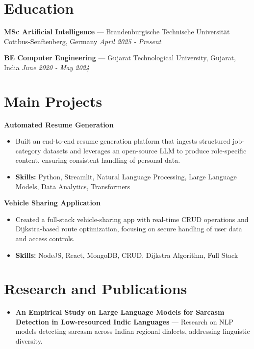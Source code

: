 \documentclass[a4paper,10pt]{article}
\begin{document}
\section*{Education}
\textbf{MSc Artificial Intelligence} — Brandenburgische Technische Universität Cottbus-Senftenberg, Germany \hfill \textit{April 2025 - Present}\par
\vspace{1.5pt}
\textbf{BE Computer Engineering} — Gujarat Technological University, Gujarat, India \hfill \textit{June 2020 - May 2024}\par

\section*{Main Projects}
\textbf{Automated Resume Generation}\par
\vspace{1pt}
\begin{itemize}
  \item Built an end-to-end resume generation platform that ingests structured job-category datasets and leverages an open-source LLM to produce role-specific content, ensuring consistent handling of personal data.
  \item \textbf{Skills:} Python, Streamlit, Natural Language Processing, Large Language Models, Data Analytics, Transformers
\end{itemize}
\vspace{3pt}
\textbf{Vehicle Sharing Application}\par
\vspace{1pt}
\begin{itemize}
  \item Created a full-stack vehicle-sharing app with real-time CRUD operations and Dijkstra-based route optimization, focusing on secure handling of user data and access controls.
  \item \textbf{Skills:} NodeJS, React, MongoDB, CRUD, Dijkstra Algorithm, Full Stack
\end{itemize}

\section*{Research and Publications}
\begin{itemize}
\item \textbf{An Empirical Study on Large Language Models for Sarcasm Detection in Low-resourced Indic Languages} — Research on NLP models detecting sarcasm across Indian regional dialects, addressing linguistic diversity.
\end{itemize}
\end{document}

